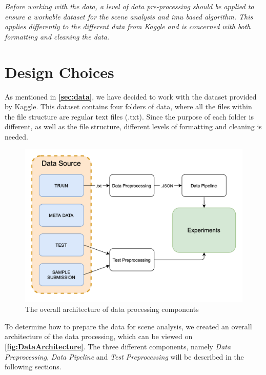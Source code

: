 \textit{Before working with the data, a level of data pre-processing should be applied to ensure a workable dataset for the scene analysis and \gls{imu} based algorithm. This applies differently to the different data from Kaggle and is concerned with both formatting and cleaning the data.}

\section{Design Choices}
As mentioned in \textbf{\autoref{sec:data}}, we have decided to work with the dataset provided by Kaggle. This dataset contains four folders of data, where all the files within the file structure are regular text files (.txt). Since the purpose of each folder is different, as well as the file structure, different levels of formatting and cleaning is needed.

\begin{figure}[H]
    \centering
    \includegraphics[scale=0.35]{Images/DataStandard/DataFlow.png}
    \caption{The overall architecture of data processing components}
    \label{fig:DataArchitecture}
\end{figure}

To determine how to prepare the data for scene analysis, we created an overall architecture of the data processing, which can be viewed on \textbf{\autoref{fig:DataArchitecture}}. The three different components, namely \textit{Data Preprocessing}, \textit{Data Pipeline} and \textit{Test Preprocessing} will be described in the following sections. %

